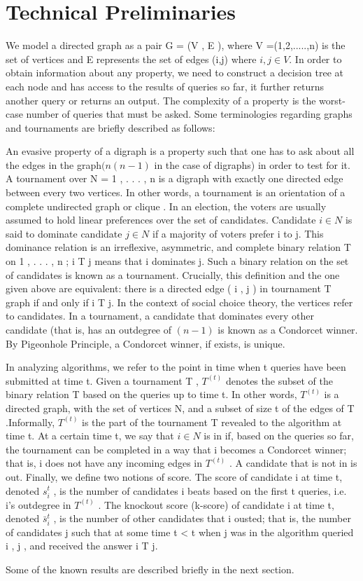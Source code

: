 \documentclass{article}
\begin{document}
\section{Technical Preliminaries}
We model a directed graph as a pair G = (V , E ), where V =(1,2,.....,n) is the set of vertices and E represents the set of edges (i,j) where \(i,j \in V\). In order to obtain information about any property, we need to construct a decision tree at each node and has access to the results of queries so far, it further returns another query or returns an output. The complexity of a property is the worst-case number of queries that must be asked. Some terminologies regarding graphs and tournaments are briefly described as follows:\par
An evasive property of a digraph is a property such that one has to ask about all the edges in the graph\((n ( n-1 )\) in the case of digraphs) in order to test for it. A tournament over N = { 1 , . . . , n } is a digraph with exactly one directed edge between every two vertices. In
other words, a tournament is an orientation of a complete
undirected graph or clique . In an election, the voters are usually assumed to hold linear preferences over the set of candidates. Candidate \(i \in N\) is said to dominate candidate \(j \in N\) if a majority
of voters prefer i to j. This dominance relation is an irreflexive, asymmetric, and complete binary relation T on { 1 , . . . , n } ; i T j means that i dominates j. Such a binary relation on the set of candidates is known as a tournament. Crucially, this definition and the one given above are equivalent: there is a directed edge ( i , j ) in tournament T graph if and only if i T j. In the context of social choice theory, the vertices refer to candidates. In a tournament, a candidate that dominates every other candidate (that is, has an outdegree of \((n-1)\) is known as a Condorcet winner. By Pigeonhole Principle, a Condorcet winner, if exists, is unique.\par
In analyzing algorithms, we refer to the point in time when t queries have been submitted at time t. Given a tournament T , \(T^{(t)}\) denotes the subset of the binary relation T based on the queries up to time t. In other words, \(T^{(t)}\) is a directed graph, with the set of vertices N, and a subset of size t of the edges of T .Informally, \(T^{(t)}\) is the part of the tournament T revealed to the algorithm at time t. At a certain time t, we say that \(i \in N\) is in if, based on the queries so far, the tournament can be completed in a way that i becomes a Condorcet winner; that is, i does not have any incoming edges in \(T^{(t)}\) . A candidate that is not in is out. Finally, we define two notions of score. The score of candidate i at time t, denoted \(s_i^t\) , is the number of candidates i beats based on
the first t queries, i.e. i’s outdegree in \(T^{(t)}\) . The knockout score (k-score) of candidate i at time t, denoted \(\bar{s}_i^t\) , is the number of other candidates that i ousted; that is, the number of candidates j such that at some time t < t when j was in the algorithm queried i , j , and received the answer i T j.\par
Some of the known results are described briefly in the next section.
\end{document}
